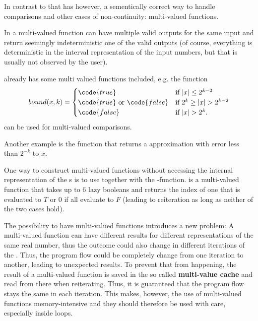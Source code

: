 		In contrast to that \irram has however, a sementically correct way to handle comparisons and other
		cases of non-continuity: multi-valued functions.

		In \irram a multi-valued function can have multiple valid outputs for the same input and 
		return seemingly indeterministic one of the valid outputs (of course, everything is deterministic in the 
		interval representation of the input numbers, but that is usually not observed by the user).
		
		\irram already has some multi valued functions included, e.g. the function
		\begin{equation*}
			bound(x,k) = 
			\begin{cases}
				\code{true} & \mbox{if } | x | \leq 2^{k-2} \\
				\code{true} \mbox{ or } \code{false} & \mbox{if } 2^k \geq |x| > 2^{k-2} \\
				 \code{false}  & \mbox{if } |x| > 2^k.
			\end{cases}
		\end{equation*}
		can be used for multi-valued comparisons.

		Another example is the function  that returns a  
		approximation with error less than $2^{-k}$ to $x$.	

		One way to construct multi-valued functions without accessing the internal representation of the {\real}s 
		is to use  together with the -function.
		 is a multi-valued function that takes up to 6 lazy booleans and returns the index of one 
		that is evaluated to $T$ or $0$ if all evaluate to $F$ (leading to reiteration as long as neither of the two cases hold).

		The possibility to have multi-valued functions introduces a new problem: 
		A multi-valued function can have different results for different representations of the same real number,
		thus the outcome could also change in different iterations of the \irram. 
		Thus, the program flow could be completely change from one iteration to another, leading to unexpected results.
		To prevent that from happening, the result of a multi-valued function is saved in the so called \textbf{multi-value cache}
		and read from there when reiterating. 
		Thus, it is guaranteed that the program flow stays the same in each iteration.
		This makes, however, the use of multi-valued functions memory-intensive and they should therefore be used with care,
		especially inside loops.
